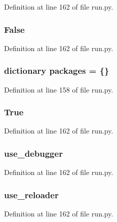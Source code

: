 Definition at line 162 of file run.\+py.

\subsubsection[{\texorpdfstring{False}{False}}]{\setlength{\rightskip}{0pt plus 5cm}False}\hypertarget{namespacerun_a36cde68b055f3f2ee671020af4ccf4e2}{}\label{namespacerun_a36cde68b055f3f2ee671020af4ccf4e2}


Definition at line 162 of file run.\+py.

\subsubsection[{\texorpdfstring{packages}{packages}}]{\setlength{\rightskip}{0pt plus 5cm}dictionary packages = \{\}}\hypertarget{namespacerun_ab966ab9458ccaf3792ee29eb175a235c}{}\label{namespacerun_ab966ab9458ccaf3792ee29eb175a235c}


Definition at line 158 of file run.\+py.

\subsubsection[{\texorpdfstring{True}{True}}]{\setlength{\rightskip}{0pt plus 5cm}True}\hypertarget{namespacerun_a643a20c0c59588a0f741a6095e2025fd}{}\label{namespacerun_a643a20c0c59588a0f741a6095e2025fd}


Definition at line 162 of file run.\+py.

\subsubsection[{\texorpdfstring{use\+\_\+debugger}{use_debugger}}]{\setlength{\rightskip}{0pt plus 5cm}use\+\_\+debugger}\hypertarget{namespacerun_a84ec172ec1d54c6a54e6e648c35c934f}{}\label{namespacerun_a84ec172ec1d54c6a54e6e648c35c934f}


Definition at line 162 of file run.\+py.

\subsubsection[{\texorpdfstring{use\+\_\+reloader}{use_reloader}}]{\setlength{\rightskip}{0pt plus 5cm}use\+\_\+reloader}\hypertarget{namespacerun_a33f3d888c60d659e953c90c18f532678}{}\label{namespacerun_a33f3d888c60d659e953c90c18f532678}


Definition at line 162 of file run.\+py.

